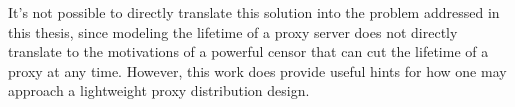 It's not possible to directly translate this solution into the problem addressed in this thesis, since modeling the lifetime of a proxy server does not directly translate to the motivations of a powerful censor that can cut the lifetime of a proxy at any time. However, this work does provide useful hints for how one may approach a lightweight proxy distribution design.\\


